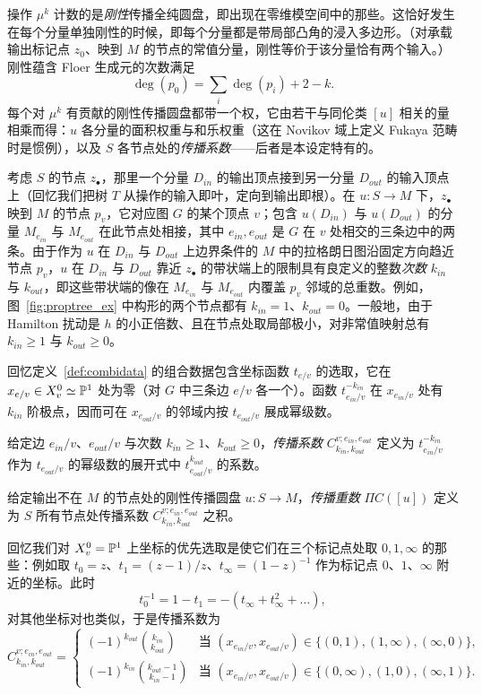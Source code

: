 操作 $\mu^k$ 计数的是\emph{刚性}传播全纯圆盘，即出现在零维模空间中的那些。这恰好发生在每个分量单独刚性的时候，即每个分量都是带局部凸角的浸入多边形。（对承载输出标记点 $z_0$、映到 $M$ 的节点的常值分量，刚性等价于该分量恰有两个输入。）刚性蕴含 Floer 生成元的次数满足
\[
\deg(p_0)=\sum_i \deg(p_i)+2-k .
\]
每个对 $\mu^k$ 有贡献的刚性传播圆盘都带一个权，它由若干与同伦类 $[u]$ 相关的量相乘而得：$u$ 各分量的面积权重与和乐权重（这在 Novikov 域上定义 Fukaya 范畴时是惯例），以及 $S$ 各节点处的\emph{传播系数}——后者是本设定特有的。

考虑 $S$ 的节点 $z_\bullet$，那里一个分量 $D_{in}$ 的输出顶点接到另一分量 $D_{out}$ 的输入顶点上（回忆我们把树 $T$ 从操作的输入即叶，定向到输出即根）。在 $u:S\to M$ 下，$z_\bullet$ 映到 $M$ 的节点 $p_v$，它对应图 $G$ 的某个顶点 $v$；包含 $u(D_{in})$ 与 $u(D_{out})$ 的分量 $M_{e_{in}}$ 与 $M_{e_{out}}$ 在此节点处相接，其中 $e_{in},e_{out}$ 是 $G$ 在 $v$ 处相交的三条边中的两条。由于作为 $u$ 在 $D_{in}$ 与 $D_{out}$ 上边界条件的 $M$ 中的拉格朗日图沿固定方向趋近节点 $p_v$，$u$ 在 $D_{in}$ 与 $D_{out}$ 靠近 $z_\bullet$ 的带状端上的限制具有良定义的整数\emph{次数} $k_{in}$ 与 $k_{out}$，即这些带状端的像在 $M_{e_{in}}$ 与 $M_{e_{out}}$ 内覆盖 $p_v$ 邻域的总重数。例如，图~\ref{fig:proptree_ex} 中构形的两个节点都有 $k_{in}=1$、$k_{out}=0$。一般地，由于 Hamilton 扰动是 $h$ 的小正倍数、且在节点处取局部极小，对非常值映射总有 $k_{in}\geq 1$ 与 $k_{out}\geq 0$。

回忆定义~\ref{def:combidata} 的组合数据包含坐标函数 $t_{e/v}$ 的选取，它在 $x_{e/v}\in X^0_v\simeq\mathbb{P}^1$ 处为零（对 $G$ 中三条边 $e/v$ 各一个）。函数 $t_{e_{in}/v}^{-k_{in}}$ 在 $x_{e_{in}/v}$ 处有 $k_{in}$ 阶极点，因而可在 $x_{e_{out}/v}$ 的邻域内按 $t_{e_{out}/v}$ 展成幂级数。

\begin{defi}\label{defi:propcoeff}
给定边 $e_{in}/v$、$e_{out}/v$ 与次数 $k_{in}\geq 1$、$k_{out}\geq 0$，\emph{传播系数}
$C^{v;e_{in},e_{out}}_{k_{in},k_{out}}$ 定义为 $t_{e_{in}/v}^{-k_{in}}$ 作为 $t_{e_{out}/v}$ 的幂级数的展开式中 $t_{e_{out}/v}^{k_{out}}$ 的系数。

给定输出不在 $M$ 的节点处的刚性传播圆盘 $u:S\to M$，\emph{传播重数} $\Pi C([u])$ 定义为 $S$ 所有节点处传播系数 $C^{v;e_{in},e_{out}}_{k_{in},k_{out}}$ 之积。
\end{defi}

\begin{example}
回忆我们对 $X^0_v=\mathbb{P}^1$ 上坐标的优先选取是使它们在三个标记点处取 $0,1,\infty$ 的那些：例如取 $t_0=z$、$t_1=(z-1)/z$、$t_\infty=(1-z)^{-1}$ 作为标记点 $0$、$1$、$\infty$ 附近的坐标。此时
\[
t_0^{-1}=1-t_1=-(t_\infty+t_\infty^2+\dots),
\]
对其他坐标对也类似，于是传播系数为
\[
C^{v;e_{in},e_{out}}_{k_{in},k_{out}}=\begin{cases}
\displaystyle (-1)^{k_{out}}\binom{k_{in}}{k_{out}} & \text{当 }(x_{e_{in}/v},x_{e_{out}/v})\in\{(0,1),(1,\infty),(\infty,0)\},\\[10pt]
\displaystyle (-1)^{k_{in}}\binom{k_{out}-1}{k_{in}-1} & \text{当 }(x_{e_{in}/v},x_{e_{out}/v})\in\{(0,\infty),(1,0),(\infty,1)\}.
\end{cases}
\]
\end{example}

